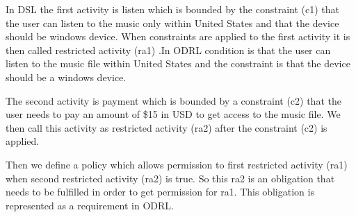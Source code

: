 

In DSL the first activity is listen which is bounded by the constraint (c1) that the user can listen to the music only within United States and that the device should be windows device. When constraints are applied to the first activity it is then called restricted activity (ra1) .In ODRL condition is that the user can listen to the music file within United States and the constraint is that the device should be a windows device.

The second activity is payment which is bounded by a constraint (c2) that the user needs to pay an amount of \$15 in USD to get access to the music file. We then call this activity as restricted activity (ra2) after the constraint (c2) is applied. 

Then we define a policy which allows permission to first restricted activity (ra1) when second restricted activity (ra2) is true. So this ra2 is an obligation that needs to be fulfilled in order to get permission for ra1. This obligation is represented as a requirement in ODRL.